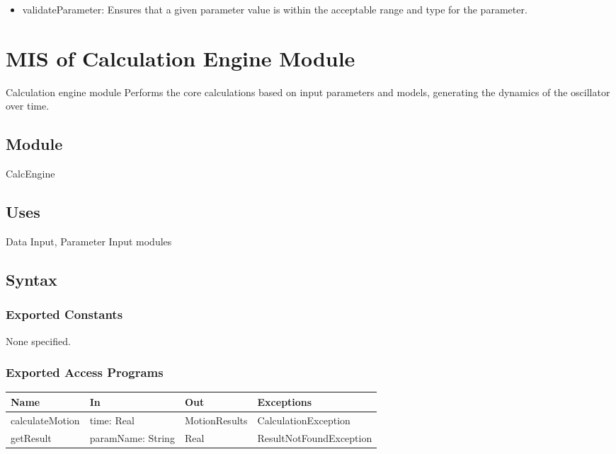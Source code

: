 \documentclass[12pt, titlepage]{article}
\begin{document}
\begin{itemize}
  \item validateParameter: Ensures that a given parameter value is within the acceptable range and type for the parameter.
\end{itemize}



\section{MIS of Calculation Engine Module} \label{mCE}

Calculation engine module Performs the core calculations based on input parameters and models, generating
the dynamics of the oscillator over time.

\subsection{Module}
CalcEngine

\subsection{Uses}
Data Input, Parameter Input modules

\subsection{Syntax}

\subsubsection{Exported Constants}
None specified.

\subsubsection{Exported Access Programs}

\begin{center}
\begin{tabular}{p{4cm} p{4cm} p{3cm} p{5cm}}
\hline
\textbf{Name} & \textbf{In} & \textbf{Out} & \textbf{Exceptions} \\
\hline
calculateMotion & time: Real & MotionResults & CalculationException \\
getResult & paramName: String & Real & ResultNotFoundException \\
\hline
\end{tabular}
\end{center}
\end{document}
